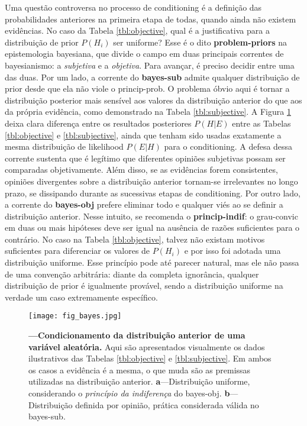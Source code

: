 \documentclass[./main.tex]{subfiles}
\begin{document}
\par Uma questão controversa no processo de \gls{conditioning} é a definição das probabilidades anteriores na primeira etapa de todas, quando ainda não existem evidências. No caso da Tabela \ref{tbl:objective}, qual é a justificativa para a distribuição de \gls{prior} $P(H_i)$ ser uniforme? Esse é o dito \textbf{\gls{problem-priors}} na epistemologia bayesiana, que divide o campo em duas principais correntes de bayesianismo: a \textit{subjetiva} e a \textit{objetiva}. Para avançar, é preciso decidir entre uma das duas. Por um lado, a corrente do \textbf{\gls{bayes-sub}} admite qualquer distribuição de \gls{prior} desde que ela não viole o \gls{princip-prob}. O problema óbvio aqui é tornar a distribuição posterior mais sensível aos valores da distribuição anterior do que aos da própria evidência, como demonstrado na Tabela \ref{tbl:subjective}. A Figura \ref{fig:bayes} deixa clara diferença entre os resultados posteriores $P(H | E)$ entre as Tabelas \ref{tbl:objective} e \ref{tbl:subjective}, ainda que tenham sido usadas exatamente a mesma distribuição de \gls{likelihood} $P(E | H)$ para o \gls{conditioning}. A defesa dessa corrente sustenta que é legítimo que diferentes opiniões subjetivas possam ser comparadas objetivamente. Além disso, se as evidências forem consistentes, opiniões divergentes sobre a distribuição anterior tornam-se irrelevantes no longo prazo, se dissipando durante as sucessivas etapas de \gls{conditioning}. Por outro lado, a corrente do \textbf{\gls{bayes-obj}} prefere eliminar todo e qualquer viés ao se definir a distribuição anterior. Nesse intuito, se recomenda o \textbf{\gls{princip-indif}}: o \gls{grau-convic} em duas ou mais hipóteses deve ser igual na ausência de razões suficientes para o contrário. No caso na Tabela \ref{tbl:objective},  talvez não existam motivos suficientes para diferenciar os valores de $P(H_i)$ e por isso foi adotada uma distribuição uniforme. Esse princípio pode até parecer natural, mas ele não passa de uma convenção arbitrária: diante da completa ignorância, qualquer distribuição de \gls{prior} é igualmente provável, sendo a distribuição uniforme na verdade um caso extremamente específico.

\begin{figure}[t!] %
	\centering				
	\texttt{[image: fig\_bayes.jpg]}		
	\caption[Exemplo do \gls{conditioning} bayesiana]
	{\textbf{---\;Condicionamento da distribuição anterior de uma variável aleatória.}
        Aqui são apresentados visualmente os dados ilustrativos das Tabelas \ref{tbl:objective} e \ref{tbl:subjective}. Em ambos os casos a evidência é a mesma, o que muda são as premissas utilizadas na distribuição anterior. \;\textbf{a}\;---\;Distribuição uniforme, considerando o \textit{princípio da indiferença} do \gls{bayes-obj}. \;\textbf{b}\;---\;Distribuição definida por opinião, prática considerada válida no \gls{bayes-sub}.  
	}
\label{fig:bayes}  %
\end{figure}
\end{document}
